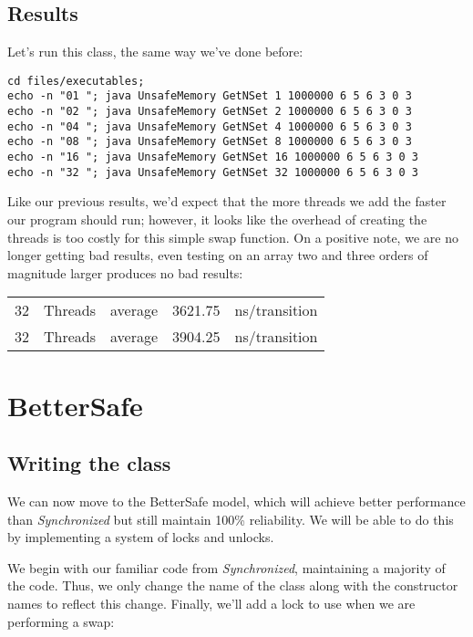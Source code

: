 \documentclass[11pt]{article}
\begin{document}
\subsection{Results}
\label{sec-5-2}
Let's run this class, the same way we've done before:

\begin{verbatim}
cd files/executables;
echo -n "01 "; java UnsafeMemory GetNSet 1 1000000 6 5 6 3 0 3
echo -n "02 "; java UnsafeMemory GetNSet 2 1000000 6 5 6 3 0 3
echo -n "04 "; java UnsafeMemory GetNSet 4 1000000 6 5 6 3 0 3
echo -n "08 "; java UnsafeMemory GetNSet 8 1000000 6 5 6 3 0 3
echo -n "16 "; java UnsafeMemory GetNSet 16 1000000 6 5 6 3 0 3
echo -n "32 "; java UnsafeMemory GetNSet 32 1000000 6 5 6 3 0 3
\end{verbatim}

Like our previous results, we'd expect that the more threads we add
the faster our program should run; however, it looks like the overhead
of creating the threads is too costly for this simple swap function.
On a positive note, we are no longer getting bad results, even testing
on an array two and three orders of magnitude larger produces no
bad results:

\begin{center}
\begin{tabular}{rllrl}
32 & Threads & average & 3621.75 & ns/transition\\
32 & Threads & average & 3904.25 & ns/transition\\
\end{tabular}
\end{center}

\section{BetterSafe}
\label{sec-6}
\subsection{Writing the class}
\label{sec-6-1}
We can now move to the BetterSafe model, which will
achieve better performance than \emph{Synchronized} but
still maintain 100\% reliability. We will be able to
do this by implementing a system of locks and unlocks.

We begin with our familiar code from \emph{Synchronized},
maintaining a majority of the code. Thus, we only
change the name of the class along with the constructor
names to reflect this change. Finally, we'll add a
lock to use when we are performing a swap:
\end{document}
